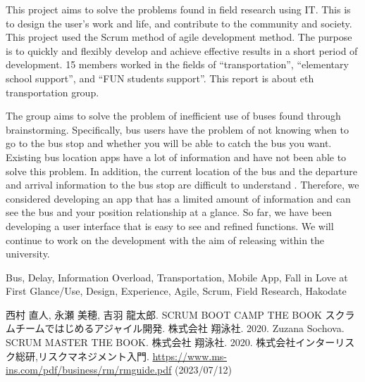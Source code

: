\documentclass[openany,11pt,papersize,dvipdfm,draft]{jsbook}
\begin{document}
\begin{eabstract}
    This project aims to solve the problems found in field research using IT.
    This is to design the user's work and life, and contribute to the community and society.
    This project used the Scrum method of agile development method.
    The purpose is to quickly and flexibly develop and achieve effective results in a short period of development.
    15 members worked in the fields of ``transportation'', ``elementary school support'', and ``FUN students support''.
    This report is about eth transportation group.

    The group aims to solve the problem of inefficient use of buses found through brainstorming.
    Specifically, bus users have the problem of not knowing when to go to the bus stop and whether you will be able to catch the bus you want.
    Existing bus location apps have a lot of information and have not been able to solve this problem.
    In addition, the current location of the bus and the departure and arrival information to the bus stop are difficult to understand .
    Therefore, we considered developing an app that has a limited amount of information and can see the bus and your position relationship at a glance.
    So far, we have been developing a user interface that is easy to see and refined functions.
    We will continue to work on the development with the aim of releasing within the university.

\begin{ekeyword}
Bus, Delay, Information Overload, Transportation, Mobile App, Fall in Love at First Glance/Use, Design, Experience, Agile, Scrum, Field Research, Hakodate
\end{ekeyword}
\end{eabstract}

\tableofcontents

\mainmatter








\begin{appendix}


\end{appendix}

\begin{thebibliography}{3}
     西村 直人, 永瀬 美穂, 吉羽 龍太郎. SCRUM BOOT CAMP THE BOOK スクラムチームではじめるアジャイル開発. 株式会社 翔泳社. 2020.
     Zuzana Sochova. SCRUM MASTER THE BOOK. 株式会社 翔泳社. 2020.
     株式会社インターリスク総研,リスクマネジメント入門. \url{https://www.ms-ins.com/pdf/business/rm/rmguide.pdf} (2023/07/12)
\end{thebibliography}
\end{document}

